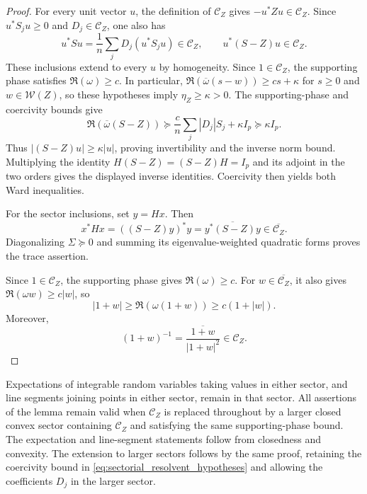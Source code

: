 \documentclass[EJP, preprint, NODS, nobera, nofontexpansion]{ejpecp}
\begin{document}
\begin{proof}
For every unit vector \(u\), the definition of \(\mathcal C_Z\) gives
\(-u^*Zu\in\mathcal C_Z\). Since \(u^*S_ju\geq0\) and
\(D_j\in\mathcal C_Z\), one also has
\[
    u^*Su=\frac1n\sum_jD_j(u^*S_ju)\in\mathcal C_Z,
    \qquad u^*(S-Z)u\in\mathcal C_Z.
\]
These inclusions extend to every \(u\) by homogeneity.
Since \(1\in\mathcal C_Z\), the supporting phase satisfies
\(\Re(\omega)\geq c\). In particular,
\(\Re(\overline{\omega}(s-w))\geq cs+\kappa\) for
\(s\geq0\) and \(w\in\mathcal W(Z)\), so these hypotheses imply
\(\eta_Z\geq\kappa>0\). The supporting-phase and coercivity bounds give
\[
    \Re\!\left(\overline{\omega}(S-Z)\right)
    \succeq\frac cn\sum_j|D_j|S_j+\kappa I_p
    \succeq\kappa I_p.
\]
Thus \(|(S-Z)u|\geq\kappa|u|\), proving invertibility and the inverse
norm bound. Multiplying the identity \(H(S-Z)=(S-Z)H=I_p\) and its
adjoint in the two orders gives the displayed inverse identities.
Coercivity then yields both Ward inequalities.

For the sector inclusions, set \(y=Hx\). Then
\[
    x^*Hx=((S-Z)y)^*y
    =\overline{y^*(S-Z)y}\in\overline{\mathcal C_Z}.
\]
Diagonalizing \(\Sigma\succeq0\) and summing its eigenvalue-weighted
quadratic forms proves the trace assertion.



Since \(1\in\mathcal C_Z\), the supporting phase gives
\(\Re(\omega)\geq c\). For \(w\in\overline{\mathcal C_Z}\), it also
gives \(\Re(\omega w)\geq c|w|\), so
\[
    |1+w|\geq\Re(\omega(1+w))\geq c(1+|w|).
\]
Moreover,
\[
    (1+w)^{-1}=\frac{\overline{1+w}}{|1+w|^2}\in\mathcal C_Z.
\]
\end{proof}

Expectations of integrable random variables taking values in either
sector, and line segments joining points in either sector, remain in that
sector. All assertions of the lemma remain valid when $\mathcal C_Z$
is replaced throughout by a larger closed convex sector containing
$\mathcal C_Z$ and satisfying the same supporting-phase bound. The expectation and line-segment statements
follow from closedness and convexity. The extension to larger sectors
follows by the same proof, retaining the coercivity bound in
\eqref{eq:sectorial_resolvent_hypotheses} and allowing the coefficients
\(D_j\) in the larger sector.
\end{document}

